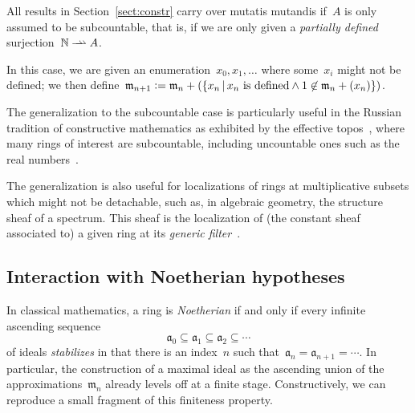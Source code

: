 \documentclass[com,11pt,crcready]{iosart2x}
\theoremstyle{definition}
\theoremstyle{plain}
\theoremstyle{remark}
\newcommand{\aaa}{\mathfrak{a}}
\newcommand{\mmm}{\mathfrak{m}}
\newcommand{\NN}{\mathbb{N}}
\newcommand{\defeq}{\vcentcolon=}
\renewcommand{\_}{\mathpunct{.}\,}
\begin{document}
\newcommand{\rightrightharpoonup}{\mathrel{\mathrlap{\rightharpoonup}\mkern1mu\rightharpoonup}}
All results in Section~\ref{sect:constr} carry over mutatis mutandis if~$A$ is
only assumed to be subcountable, that is, if we are only
given a \emph{partially defined} surjection~$\NN \rightrightharpoonup A$.

In
this case, we are given an enumeration~$x_0,x_1,\ldots$ where some~$x_i$
might not be defined; we then define~$\mmm_{n+1} \defeq
\mmm_n + (\{ x_n \,|\, \text{$x_n$ is defined} \wedge 1 \not\in \mmm_n + (x_n) \})$.

The generalization to the subcountable case is particularly useful in the
Russian tradition of constructive mathematics as exhibited by the ef{}fective
topos~\cite{hyland:effective-topos,oosten:realizability,phoa:effective,bauer:c2c},
where many rings of interest are subcountable, including uncountable ones such as the real
numbers~\cite[Prop.~7.2]{hyland:effective-topos}.

The generalization is also useful for
localizations of rings at multiplicative subsets which might not be detachable,
such as, in algebraic geometry, the structure sheaf of a spectrum. This sheaf
is the localization of (the constant sheaf associated to) a given ring at its
\emph{generic filter}~\cite[Section~3.3]{blechschmidt:generalized-spaces}.


\subsection{Interaction with Noetherian hypotheses}

In classical mathematics, a ring is \emph{Noetherian} if and only if every
infinite ascending sequence
\[ \aaa_0 \subseteq \aaa_1 \subseteq \aaa_2 \subseteq \cdots \]
of ideals \emph{stabilizes} in that there is an index~$n$ such that~$\aaa_n =
\aaa_{n+1} = \cdots$. In particular, the construction of a maximal ideal as the
ascending union of the approximations~$\mmm_n$ already levels off at a finite
stage. Constructively, we can reproduce a small fragment of this
finiteness property.
\end{document}
